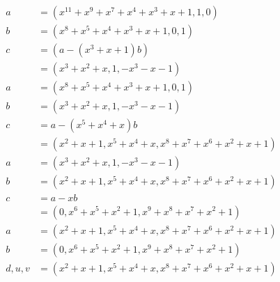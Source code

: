 \documentclass{article}
\begin{document}
\section{}
\begin{equation}
\begin{aligned}
a &= (x^{11} + x^9 + x^7 + x^4 + x^3 + x + 1, 1, 0) \\
b &= (x^8 + x^5 + x^4 + x^3 + x + 1, 0, 1) \\
c &= (a-(x^3 + x + 1)b) \\
  &= (x^3 + x^2 + x, 1, -x^3 - x - 1) \\
a &= (x^8 + x^5 + x^4 + x^3 + x + 1, 0, 1) \\
b &= (x^3 + x^2 + x, 1, -x^3 - x - 1) \\
c &= a-(x^5 + x^4 + x)b \\
  &= (x^2 + x + 1, x^5 + x^4 + x, x^8 + x^7 + x^6 + x^2 + x + 1) \\
a &= (x^3 + x^2 + x, 1, -x^3 - x - 1) \\
b &= (x^2 + x + 1, x^5 + x^4 + x, x^8 + x^7 + x^6 + x^2 + x + 1) \\
c &= a-xb \\
  &= (0, x^6 + x^5 + x^2 + 1, x^9 + x^8 + x^7 + x^2 + 1) \\
a &= (x^2 + x + 1, x^5 + x^4 + x, x^8 + x^7 + x^6 + x^2 + x + 1) \\
b &= (0, x^6 + x^5 + x^2 + 1, x^9 + x^8 + x^7 + x^2 + 1) \\
d,u,v &= (x^2 + x + 1, x^5 + x^4 + x, x^8 + x^7 + x^6 + x^2 + x + 1)
\end{aligned}
\end{equation}
\end{document}
